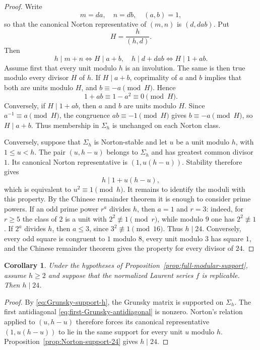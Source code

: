 \documentclass[11pt]{amsart}
\newtheorem{cor}[thm]{Corollary}
\theoremstyle{definition}
\theoremstyle{remark}
\numberwithin{equation}{section}
\begin{document}
\begin{proof}
Write
\[
m=da,\quad n=db,\quad (a,b)=1,
\]
so that the canonical Norton representative of $(m,n)$ is $(d,dab)$.  Put
\[
H=\frac{h}{(h,d)}.
\]
Then
\[
h\mid m+n\iff H\mid a+b,
\quad
h\mid d+dab\iff H\mid1+ab.
\]
Assume first that every unit modulo $h$ is an involution.  The same is then true modulo every divisor $H$ of $h$.  If $H\mid a+b$, coprimality of $a$ and $b$ implies that both are units modulo $H$, and $b\equiv-a\pmod H$.  Hence
\[
1+ab\equiv1-a^2\equiv0\pmod H.
\]
Conversely, if $H\mid1+ab$, then $a$ and $b$ are units modulo $H$.  Since $a^{-1}\equiv a\pmod H$, the congruence $ab\equiv-1\pmod H$ gives $b\equiv-a\pmod H$, so $H\mid a+b$.  Thus membership in $\Sigma_h$ is unchanged on each Norton class.

Conversely, suppose that $\Sigma_h$ is Norton-stable and let $u$ be a unit modulo $h$, with $1\leq u<h$.  The pair $(u,h-u)$ belongs to $\Sigma_h$ and has greatest common divisor $1$.  Its canonical Norton representative is $(1,u(h-u))$.  Stability therefore gives
\[
h\mid1+u(h-u),
\]
which is equivalent to $u^2\equiv1\pmod h$.  It remains to identify the moduli with this property.  By the Chinese remainder theorem it is enough to consider prime powers.  If an odd prime power $r^a$ divides $h$, then $a=1$ and $r=3$: indeed, for $r\geq5$ the class of $2$ is a unit with $2^2\not\equiv1\pmod r$, while modulo $9$ one has $2^2\not\equiv1$.  If $2^a$ divides $h$, then $a\leq3$, since $3^2\not\equiv1\pmod{16}$.  Thus $h\mid24$.  Conversely, every odd square is congruent to $1$ modulo $8$, every unit modulo $3$ has square $1$, and the Chinese remainder theorem gives the property for every divisor of $24$.
\end{proof}

\begin{cor}\label{cor:replication-width-24}
Under the hypotheses of Proposition~\ref{prop:full-modular-support}, assume $h\geq2$ and suppose that the normalized Laurent series $f$ is replicable.  Then $h\mid24$.
\end{cor}

\begin{proof}
By \eqref{eq:Grunsky-support-h}, the Grunsky matrix is supported on $\Sigma_h$.  The first antidiagonal \eqref{eq:first-Grunsky-antidiagonal} is nonzero.  Norton's relation applied to $(u,h-u)$ therefore forces its canonical representative $(1,u(h-u))$ to lie in the same support for every unit $u$ modulo $h$.  Proposition~\ref{prop:Norton-support-24} gives $h\mid24$.
\end{proof}
\end{document}
